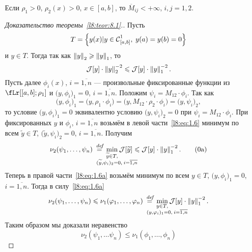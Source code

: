 \begin{_rem}
	Если $\rho_1>0$, $\rho_2(x)>0$, $x\in[a,b]$, то $\overline{M}_{ij}<+\infty$, $i,j=1,2$.
\end{_rem}
\begin{proof}[Доказательство теоремы~\ref{l8:teor:8.1}.]
	Пусть
	\begin{equation*}
		T=\left\{y(x)|y\in\Cfn[{[a,b]}]{1},\;y(a)=y(b)=0\right\}
	\end{equation*}
	и $y\in T$. Тогда так как $\norm{y}_2\geqslant\norm{y}_1$, то 
	\begin{equation}\label{l8:eq:1.6}
		\J[y]\cdot\norm{y}_2^{-2}\leqslant\J[y]\cdot\norm{y}_1^{-2}.
	\end{equation}
	Пусть далее $\phi_i(x)$, $i=\overline{1,n}$ --- произвольные фиксированные функции из $\fLr[{[a,b];\rho_1}]$ и $\big(y,\phi_i\big)_1=0$, $i=\overline{1,n}$. Положим $\psi_i=M_{12}\cdot\phi_i$. Так как
	\begin{equation*}
		\big(y,\phi_i\big)_1=\big(y,\rho_1\cdot\phi_i\big)=\big(y,M_{12}\cdot\rho_2\cdot\phi_i\big)=\big(y,\psi_i\big)_2,
	\end{equation*}
	то условие $\big(y,\phi_i\big)_1=0$ эквивалентно условию $\big(y,\psi_i\big)_2=0$ при $\psi_i=M_{12}\cdot\phi_i$. При фиксированных $y$ и $\phi_i$, $i=\overline{1,n}$ возьмём в левой части~\eqref{l8:eq:1.6} минимум по всем $\widetilde{y}\in T$, $\big(\widetilde{y},\psi_i\big)_2=0$, $i=\overline{1,n}$. Получим
	\begin{equation}\label{l8:eq:1.6a}
		\nu_2(\psi_1,\ldots,\psi_n)\eqdef\min\limits_{\substack{\widetilde{y}\in T,\\\lefteqn{\scriptstyle \hspace*{-0.8cm}(\widetilde{y},\psi_i)_2=0,\:i=\overline{1,n}}}}\J[\widetilde{y}]\leqslant\J[y]\cdot\norm{y}_1^{-2}. \tag{\theequation a}
	\end{equation}
	Теперь в правой части~\eqref{l8:eq:1.6a} возьмём минимум по всем $y\in T$, $\big(y,\phi_i\big)_1=0$, $i=\overline{1,n}$. Тогда в силу~\eqref{l8:eq:1.6a}
	\begin{equation*}
		\nu_2(\psi_1,\ldots,\psi_n)\leqslant\nu_1(\phi_1,\ldots,\phi_n)\eqdef\min\limits_{\substack{{y}\in T,\\\lefteqn{\scriptstyle \hspace*{-0.8cm}(y,\phi_i)_1=0,\:i=\overline{1,n}}}}\J[y]\cdot\norm{y}_1^{-2}.
	\end{equation*}
	Таким образом мы доказали неравенство
	\begin{equation}\label{l8:eq:1.6b}
		\nu_2(\psi_1,\ldots\psi_n)\leqslant\nu_1(\phi_1,\ldots,\phi_n)\tag{\theequation b}

\end{equation}
\end{proof}
